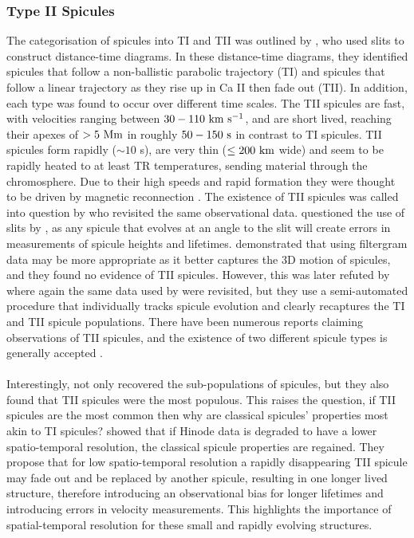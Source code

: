 \documentclass[12pt]{ociamthesis}
\newcommand{\kms}{~\rm{km ~s^{-1}}}
\newcommand{\np}{\\ \\}
\begin{document}
\subsubsection{Type II Spicules}
\label{subsec:TII}
The categorisation of spicules into TI and TII was outlined by \cite{Pontieu2007PASJ}, who used slits to construct distance-time diagrams. In these distance-time diagrams, they identified spicules that follow a non-ballistic parabolic trajectory (TI) and spicules that follow a linear trajectory as they rise up in Ca II then fade out (TII). In addition, each type was found to occur over different time scales. The TII spicules are fast, with velocities ranging between $30-110\kms$, and are short lived, reaching their apexes of $>5~\rm{Mm}$ in roughly $50-150~\rm{s}$ in contrast to TI spicules. TII spicules form rapidly ($\sim 10$ s), are very thin ($\leq 200~\rm{km}$ wide) and seem to be rapidly heated to at least TR temperatures, sending material through the chromosphere. Due to their high speeds and rapid formation they were thought to be driven by magnetic reconnection \citep{Pontieu2007PASJ}. The existence of TII spicules was called into question by \cite{Zhang2012ApJ} who revisited the same observational data. \cite{Zhang2012ApJ} questioned the use of slits by \cite{Pontieu2007PASJ}, as any spicule that evolves at an angle to the slit will create errors in measurements of spicule heights and lifetimes. \cite{Zhang2012ApJ} demonstrated that using filtergram data may be more appropriate as it better captures the 3D motion of spicules, and they found no evidence of TII spicules. However, this was later refuted by \cite{Pereira2012} where again the same data used by \cite{Pontieu2007PASJ} were revisited, but they use a semi-automated procedure that individually tracks spicule evolution and clearly recaptures the TI and TII spicule populations. There have been numerous reports claiming observations of TII spicules, and the existence of two different spicule types is generally accepted \citep{Rouppe2009ApJ, Rouppe2015ApJ799L3R, Shetye2016AA589A3S, Rutten2019AA632A96R, Yurchyshyn2020ApJ891L21Y, Chintzoglou2021ApJ90682C}. \np   
%
Interestingly, \cite{Pereira2012} not only recovered the sub-populations of spicules, but they also found that TII spicules were the most populous. This raises the question, if TII spicules are the most common then why are classical spicules' properties most akin to TI spicules? \cite{Pereira2013ApJ76469P} showed that if Hinode data is degraded to have a lower spatio-temporal resolution, the classical spicule properties are regained. They propose that for low spatio-temporal resolution a rapidly disappearing TII spicule may fade out and be replaced by another spicule, resulting in one longer lived structure, therefore introducing an observational bias for longer lifetimes and introducing errors in velocity measurements. This highlights the importance of spatial-temporal resolution for these small and rapidly evolving structures.\np
\end{document}
